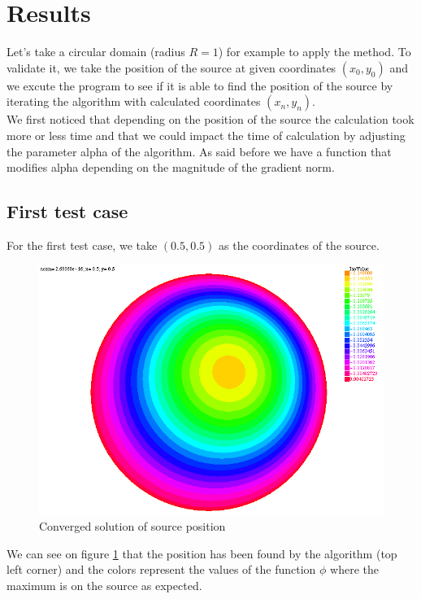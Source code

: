 \section{Results}

Let's take a circular domain (radius $R=1$) for example to apply the method. To validate it, we take the position of the source at given coordinates $(x_0, y_0)$ and we excute the program to see if it is able to find the position of the source by iterating the algorithm with calculated coordinates $(x_n, y_n)$.\\
We first noticed that depending on the position of the source the calculation took more or less time and that we could impact the time of calculation by adjusting the parameter alpha of the algorithm. As said before we have a function that modifies alpha depending on the magnitude of the gradient norm. \\

\subsection{First test case}

For the first test case, we take $(0.5, 0.5)$ as the coordinates of the source. \\
\begin{figure}[H]
	\centering
	\includegraphics[scale=0.7]{0505.png}
	\caption{Converged solution of source position}
	\label{0505}
\end{figure}
We can see on figure \ref{0505} that the position has been found by the algorithm (top left corner) and the colors represent the values of the function $\phi$ where the maximum is on the source as expected.

